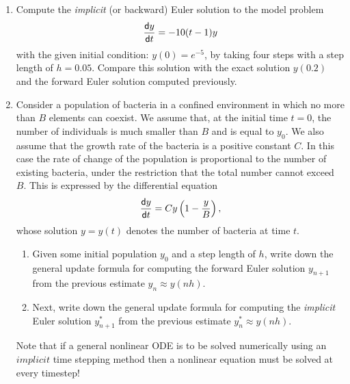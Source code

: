 \documentclass[11pt,a4paper]{article}
\newcommand{\dif}{\mathsf{d}}
\begin{document}
\begin{enumerate}


 \item \label{qdjsode4}
Compute the {\it implicit} (or {backward}) Euler solution  to the model problem 
$$
{\dif y\over \dif t} = -10(t-1)y
$$
with the given  initial condition:
$y(0)=e^{-5}$, 
by  taking  four steps with
a  step length of $h=0.05$. Compare this solution
with the exact solution  $y(0.2)$ and the forward Euler 
solution computed previously.



\item \label{qdjsode2}
 Consider a population of bacteria in a confined environment in which no more than 
 $B$ elements can coexist. We assume that, at the initial time $t=0$, the number of individuals
 is  much smaller than $B$ and is equal to $y_0$. We also assume that
 the growth rate of the bacteria is a positive constant  $C$.
 In this case the rate of change of the population is proportional to the number
 of existing bacteria, under the restriction that the total number cannot exceed
 $B$. This is expressed by the differential equation 
 $${\dif y\over \dif t} = Cy \left( 1-{y\over B}\right),$$
 whose solution $y=y(t)$ denotes the number of bacteria at time $t$.
 
 \begin{enumerate}
\item 
Given some initial population $y_0$ and a  step length of $h$,
write down the general update formula for computing the forward Euler 
solution  $y_{n+1}$  from the previous estimate $y_n\approx y(nh)$.
\item 
Next, write down the general update formula for computing the {\it implicit} Euler 
solution  $y^*_{n+1}$  from the previous estimate $y^*_n \approx y(nh)$.



 \end{enumerate}
 
Note that  if a general  nonlinear ODE is to be solved numerically using an $implicit$ time stepping
method then a nonlinear equation must be solved at every timestep!



\end{enumerate}
\end{document}
